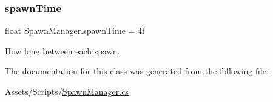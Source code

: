 \subsubsection{\texorpdfstring{spawnTime}{spawnTime}}
{\footnotesize\ttfamily float Spawn\+Manager.\+spawn\+Time = 4f}

How long between each spawn. 

The documentation for this class was generated from the following file\+:\begin{DoxyCompactItemize}
\item 
Assets/\+Scripts/\mbox{\hyperlink{_spawn_manager_8cs}{Spawn\+Manager.\+cs}}\end{DoxyCompactItemize}
